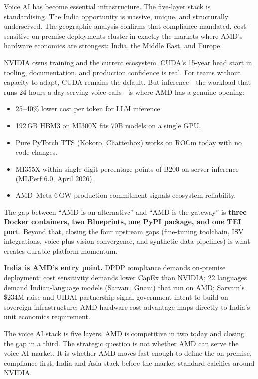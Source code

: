 \documentclass[12pt,a4paper]{article}
\begin{document}
Voice AI has become essential infrastructure.  The five-layer stack is
standardising.  The India opportunity is massive, unique, and structurally
underserved.  The geographic analysis confirms that compliance-mandated,
cost-sensitive on-premise deployments cluster in exactly the markets where
AMD's hardware economics are strongest: India, the Middle East, and Europe.

NVIDIA owns training and the current ecosystem.  CUDA's 15-year head start
in tooling, documentation, and production confidence is real.  For teams
without capacity to adapt, CUDA remains the default.  But
inference---the workload that runs 24 hours a day serving voice
calls---is where AMD has a genuine opening:

\begin{itemize}[noitemsep]
  \item 25--40\% lower cost per token for LLM inference.
  \item 192\,GB HBM3 on MI300X fits 70B models on a single GPU.
  \item Pure PyTorch TTS (Kokoro, Chatterbox) works on ROCm today with no code changes.
  \item MI355X within single-digit percentage points of B200 on server inference (MLPerf 6.0, April 2026).
  \item AMD--Meta 6\,GW production commitment signals ecosystem reliability.
\end{itemize}

The gap between ``AMD is an alternative'' and ``AMD is the gateway'' is
\textbf{three Docker containers, two Blueprints, one PyPI package, and one
TEI port}.  Beyond that, closing the four upstream gaps (fine-tuning
toolchain, ISV integrations, voice-plus-vision convergence, and synthetic
data pipelines) is what creates durable platform momentum.

\textbf{India is AMD's entry point.}  DPDP compliance demands on-premise
deployment; cost sensitivity demands lower CapEx than NVIDIA; 22 languages
demand Indian-language models (Sarvam, Gnani) that run on AMD; Sarvam's
\$234M raise and UIDAI partnership signal government intent to build on
sovereign infrastructure; AMD hardware cost advantage maps directly to
India's unit economics requirement.

The voice AI stack is five layers.  AMD is competitive in two today and
closing the gap in a third.  The strategic question is not whether AMD can
serve the voice AI market.  It is whether AMD moves fast enough to define
the on-premise, compliance-first, India-and-Asia stack before the market
standard calcifies around NVIDIA.
\end{document}
